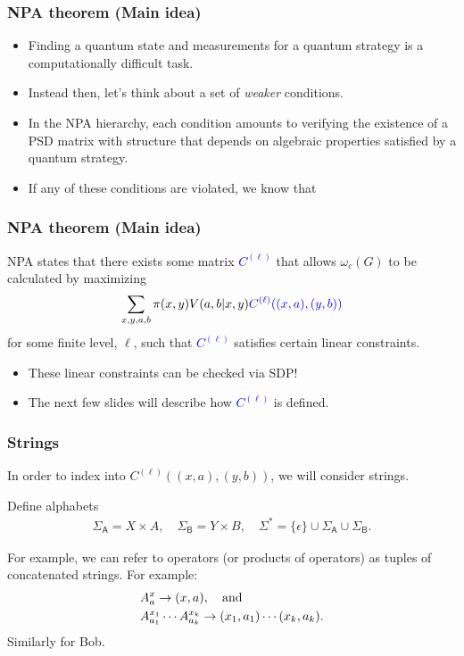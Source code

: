 \documentclass{beamer}
\def \SigmaA{\Sigma_{\reg{A}}}
\def \SigmaB{\Sigma_{\reg{B}}}
\newcommand{\reg}[1]{\mathsf{#1}}
\begin{document}
\begin{frame}
	\frametitle{NPA theorem (Main idea)}
	\begin{itemize}
		\item Finding a quantum state and measurements for a quantum strategy is a computationally difficult task. 
		\pause
		\item Instead then, let's think about a set of \emph{weaker} conditions. 
		\pause
		\item In the NPA hierarchy, each condition amounts to verifying the existence of a PSD matrix with structure that depends on algebraic properties satisfied by a quantum strategy. 
		\pause
		\item If any of these conditions are violated, we know that 
	\end{itemize}
\end{frame}   

\begin{frame}
	\frametitle{NPA theorem (Main idea)}
	NPA states that there exists some matrix \textcolor{blue}{$C^{(\ell)}$} that allows $\omega_c(G)$ to be calculated by maximizing
	\begin{align*}
		\sum_{x,y,a,b} \pi(x,y) V(a,b|x,y) \textcolor{blue}{C^{(\ell)}((x,a),(y,b))}
	\end{align*}
	for some finite level, $\ell$, such that \textcolor{blue}{$C^{(\ell)}$} satisfies certain linear constraints. 
	\vspace{5mm}
	
	\begin{itemize}
		\item These linear constraints can be checked via SDP! 
		\item The next few slides will describe how \textcolor{blue}{$C^{(\ell)}$} is defined.
	\end{itemize}
	
\end{frame}

\begin{frame}
	\frametitle{Strings}
	In order to index into $C^{(\ell)}((x,a),(y,b))$, we will consider strings. 
	\vspace{5mm}
		
	Define alphabets 
	\begin{align*}
		\SigmaA = X \times A, \quad \SigmaB = Y \times B, \quad \Sigma^* = \{\epsilon\} \cup \SigmaA \cup \SigmaB. 
	\end{align*}

For example, we can refer to operators (or products of operators) as tuples of concatenated strings. For example:
\begin{equation}
	\begin{aligned}
		&A_a^x \rightarrow (x,a), \quad \textnormal{and} \nonumber \\
		&A_{a_1}^{x_1} \cdots A_{a_k}^{x_k} \rightarrow (x_1,a_1) \cdots (x_k,a_k). \nonumber
	\end{aligned}
\end{equation}
Similarly for Bob.

\end{frame}
\end{document}

